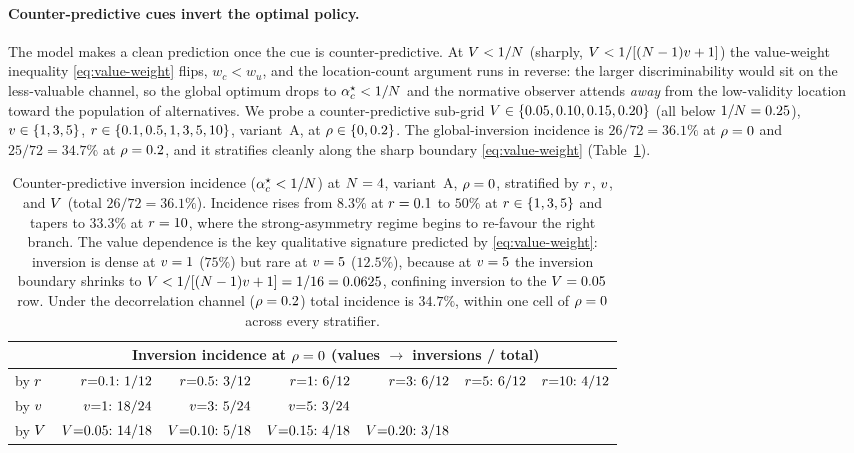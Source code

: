 \paragraph{Counter-predictive cues invert the optimal policy.}
The model makes a clean prediction once the cue is counter-predictive.
At $V < 1/N$ (sharply, $V < 1/[(N-1)v + 1]$) the
value-weight inequality \eqref{eq:value-weight} flips, $w_c < w_u$, and
the location-count argument runs in reverse: the larger discriminability
would sit on the less-valuable channel, so the global optimum drops to
$\alpha_c^\star < 1/N$ and the normative observer attends
\emph{away} from the low-validity location toward the population of
alternatives. We probe a counter-predictive sub-grid $V \in \{0.05,
0.10, 0.15, 0.20\}$ (all below $1/N = 0.25$), $v \in \{1, 3, 5\}$,
$r \in \{0.1, 0.5, 1, 3, 5, 10\}$, variant~A, at $\rho \in \{0,
0.2\}$. The global-inversion incidence is $26/72 = 36.1\%$ at $\rho =
0$ and $25/72 = 34.7\%$ at $\rho = 0.2$, and it stratifies cleanly
along the sharp boundary \eqref{eq:value-weight}
(Table~\ref{tab:anticue}).
%
\begin{table}[t]
  \centering
  \small
  \begin{tabular}{l r r r r r r}
    \toprule
    & \multicolumn{6}{c}{Inversion incidence at $\rho = 0$
      (values $\to$ inversions / total)} \\
    \midrule
    by $r$ &
    $r{=}0.1{:}\ 1/12$ &
    $r{=}0.5{:}\ 3/12$ &
    $\Rsens{=}1{:}\ 6/12$ &
    $\Rsens{=}3{:}\ 6/12$ &
    $\Rsens{=}5{:}\ 6/12$ &
    $r{=}10{:}\ 4/12$ \\
    by $v$ &
    $\val{=}1{:}\ 18/24$ &
    $\val{=}3{:}\ 5/24$ &
    $\val{=}5{:}\ 3/24$ &
     & & \\
    by $V$ &
    $V{=}0.05{:}\ 14/18$ &
    $V{=}0.10{:}\ 5/18$ &
    $V{=}0.15{:}\ 4/18$ &
    $V{=}0.20{:}\ 3/18$ &
    & \\
    \bottomrule
  \end{tabular}
  \caption{Counter-predictive inversion incidence
  ($\alpha_c^\star < 1/N$) at $N = 4$, variant~A, $\rho = 0$,
  stratified by $r$, $v$, and $V$ (total $26/72 = 36.1\%$).
  Incidence rises from $8.3\%$ at $r = 0.1$ to $50\%$ at $r
  \in \{1, 3, 5\}$ and tapers to $33.3\%$ at $r = 10$, where the
  strong-asymmetry regime begins to re-favour the right branch. The
  value dependence is the key qualitative signature predicted by
  \eqref{eq:value-weight}: inversion is dense at $v = 1$ ($75\%$) but
  rare at $v = 5$ ($12.5\%$), because at $v = 5$ the inversion
  boundary shrinks to $V < 1/[(N-1)v + 1] = 1/16 = 0.0625$,
  confining inversion to the $V = 0.05$ row. Under the
  decorrelation channel ($\rho = 0.2$) total incidence is $34.7\%$,
  within one cell of $\rho = 0$ across every stratifier.}
  \label{tab:anticue}
\end{table}
